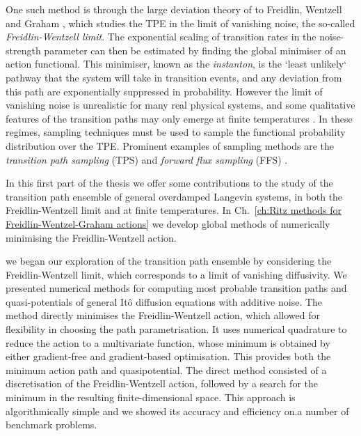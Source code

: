\documentclass[]{cam-thesis}
\begin{document}
One such method is through the large deviation theory of to Freidlin, Wentzell and Graham \citep{wentzellSmallRandomPerturbations1970, graham1973statistical, graham1987macroscopic}, which studies the TPE in the limit of vanishing noise, the so-called \textit{Freidlin-Wentzell limit}. The exponential scaling of transition rates in the noise-strength parameter can then be estimated by finding the global minimiser of an action functional. This minimiser, known as the \textit{instanton}, is the `least unlikely` pathway that the system will take in transition events, and any deviation from this path are exponentially suppressed in probability. However the limit of vanishing noise is unrealistic for many real physical systems, and some qualitative features of the transition paths may only emerge at finite temperatures \cite{pinskiTransitionPathsMolecules2010b}. In these regimes, sampling techniques must be used to sample the functional probability distribution over the TPE. Prominent examples of sampling methods are the \textit{transition path sampling} (TPS) \citep{dellagoTransitionPathSampling1998a, dellagoCalculationReactionRate1999a, dellagoEfficientTransitionPath1998, bolhuisTransitionPathSamplinga, bolhuisTransitionPathSampling2002a} and \textit{forward flux sampling} (FFS) \citep{escobedoTransitionPathSampling2009, allenForwardFluxSamplingtype2006, hussainStudyingRareEvents2020}. %

In this first part of the thesis we offer some contributions to the study of the transition path ensemble of general overdamped Langevin systems, in both the Freidlin-Wentzell limit and at finite temperatures. In Ch.~\ref{ch:Ritz methods for Freidlin-Wentzel-Graham actions} we develop global methods of numerically minimising the Freidlin-Wentzell action. 


we began our exploration of the transition path ensemble by considering the Freidlin-Wentzell limit, which corresponds to a limit of vanishing diffusivity. We presented numerical methods for computing most probable transition paths and quasi-potentials of general It\^{o} diffusion equations with additive noise. The method directly minimises the Freidlin-Wentzell action, which allowed for flexibility in choosing the path parametrisation. It uses numerical quadrature to reduce the action to a multivariate function, whose minimum is obtained by either gradient-free and gradient-based optimisation. This provides both the minimum action path and quasipotential. The direct method consisted of a discretisation of the Freidlin-Wentzell action, followed by a search for the minimum in the resulting finite-dimensional space. This approach is algorithmically simple and we showed its accuracy and efficiency on.a number of benchmark problems.
\end{document}

